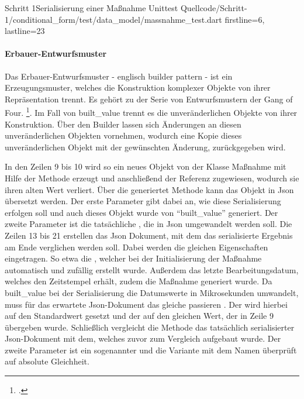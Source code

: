 \begin{alexlisting}{Schritt 1}{Serialisierung einer Maßnahme Unittest}
  {Quellcode/Schritt-1/conditional_form/test/data_model/massnahme_test.dart}
  {firstline=6, lastline=23}
  \label{lst:SerialisierungEinerMassnahmeUnittest}
\end{alexlisting}

\paragraph{Erbauer-Entwurfsmuster} Das Erbauer-Entwurfsmuster - englisch builder pattern - ist ein Erzeugungsmuster, welches die Konstruktion komplexer Objekte von ihrer Repräsentation trennt.
Es gehört zu der Serie von Entwurfsmustern der Gang of Four. \footcite[Vgl.][S. 119]{gamma2009entwurfsmuster}. Im Fall von built_value trennt es die unveränderlichen Objekte von ihrer Konstruktion. Über den Builder lassen sich Änderungen an diesen unveränderlichen Objekten vornehmen, wodurch eine Kopie dieses unveränderlichen Objekt mit der gewünschten Änderung, zurückgegeben wird.

In den Zeilen 9 bis 10 wird so ein neues Objekt von der Klasse Maßnahme mit Hilfe der Methode  erzeugt und anschließend der Referenz  zugewiesen, wodurch sie ihren alten Wert verliert.
Über die generiertet Methode   kann das Objekt in Json übersetzt werden. Der erste Parameter  gibt dabei an, wie diese Serialisierung erfolgen soll und auch dieses Objekt wurde von \enquote{built_value} generiert. Der zweite Parameter ist die tatsächliche , die in Json umgewandelt werden soll. Die Zeilen 13 bis 21 erstellen das Json Dokument, mit dem das serialisierte Ergebnis am Ende verglichen werden soll. Dabei werden die gleichen Eigenschaften eingetragen. So etwa die , welcher bei der Initialisierung der Maßnahme automatisch und zufällig erstellt wurde. Außerdem das letzte Bearbeitungsdatum, welches den Zeitstempel erhält, zudem die Maßnahme generiert wurde. Da built_value bei der Serialisierung die Datumswerte in Mikrosekunden umwandelt, muss für das erwartete Json-Dokument das gleiche passieren . Der   wird hierbei auf den Standardwert  gesetzt und der   auf den gleichen Wert, der in Zeile 9 übergeben wurde.
Schließlich vergleicht die Methode  das tatsächlich serialisierter Json-Dokument mit dem, welches zuvor zum Vergleich aufgebaut wurde.
Der zweite Parameter ist ein sogenannter  und die Variante mit dem Namen  überprüft auf absolute Gleichheit.



